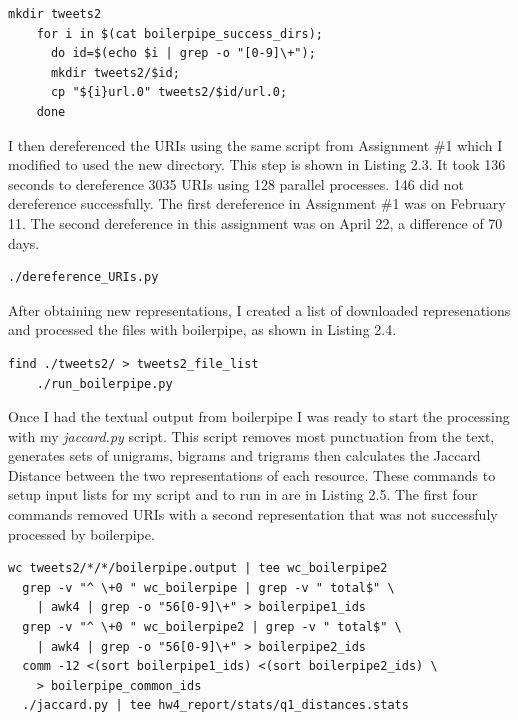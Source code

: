 \documentclass[a4paper,12pt]{article}
\begin{document}
\begin{lstlisting}[basicstyle=\ttfamily,caption={Creating Second Tweets Directory}]
    mkdir tweets2
    for i in $(cat boilerpipe_success_dirs);
      do id=$(echo $i | grep -o "[0-9]\+");
      mkdir tweets2/$id;
      cp "${i}url.0" tweets2/$id/url.0;
    done
\end{lstlisting}

I then dereferenced the URIs using the same script from Assignment \#1 which I modified to
used the new directory\cite{hw1}. This step is shown in Listing 2.3. It took 136 seconds to dereference
3035 URIs using 128 parallel processes. 146 did not dereference successfully. The first dereference in
Assignment \#1 was on February 11. The second dereference in this assignment was on April 22, a difference
of 70 days.

\begin{lstlisting}[basicstyle=\ttfamily,caption={Dereferencing URIs}]
    ./dereference_URIs.py
\end{lstlisting}

After obtaining new representations, I created a list of downloaded represenations and processed the files
with boilerpipe, as shown in Listing 2.4.

\begin{lstlisting}[basicstyle=\ttfamily,caption={Extracting Text with Boilerpipe}]
    find ./tweets2/ > tweets2_file_list
    ./run_boilerpipe.py
\end{lstlisting}

Once I had the textual output from boilerpipe I was ready to start the processing with my \emph{jaccard.py}
script. This script removes most punctuation from the text, generates sets of unigrams, bigrams and trigrams
then calculates the Jaccard Distance between the two representations of each resource\cite{wiki:jaccard}.
These commands to
setup input lists for my script and to run in are in Listing 2.5. The first four commands removed
URIs with a second representation that was not successfuly processed by boilerpipe.

\begin{lstlisting}[basicstyle=\ttfamily,caption={Calculating Jaccard Distance}]
  wc tweets2/*/*/boilerpipe.output | tee wc_boilerpipe2
  grep -v "^ \+0 " wc_boilerpipe | grep -v " total$" \
    | awk4 | grep -o "56[0-9]\+" > boilerpipe1_ids
  grep -v "^ \+0 " wc_boilerpipe2 | grep -v " total$" \
    | awk4 | grep -o "56[0-9]\+" > boilerpipe2_ids
  comm -12 <(sort boilerpipe1_ids) <(sort boilerpipe2_ids) \
    > boilerpipe_common_ids
  ./jaccard.py | tee hw4_report/stats/q1_distances.stats
\end{lstlisting}
\end{document}
